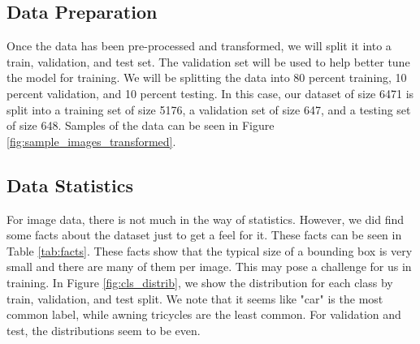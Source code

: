 \documentclass[stu,12pt,floatsintext]{apa7}
\begin{document}
\subsection{Data Preparation}
Once the data has been pre-processed and transformed, we will split it into a train, validation, and test set. The validation set will be used to help better tune the model for training. We will be splitting the data into 80 percent training, 10 percent validation, and 10 percent testing. In this case, our dataset of size 6471 is split into a training set of size 5176, a validation set of size 647, and a testing set of size 648. Samples of the data can be seen in Figure \ref{fig:sample_images_transformed}.

\subsection{Data Statistics}
For image data, there is not much in the way of statistics. However, we did find some facts about the dataset just to get a feel for it. These facts can be seen in Table \ref{tab:facts}. These facts show that the typical size of a bounding box is very small and there are many of them per image. This may pose a challenge for us in training. In Figure \ref{fig:cls_distrib}, we show the distribution for each class by train, validation, and test split. We note that it seems like "car" is the most common label, while awning tricycles are the least common. For validation and test, the distributions seem to be even.
\end{document}
